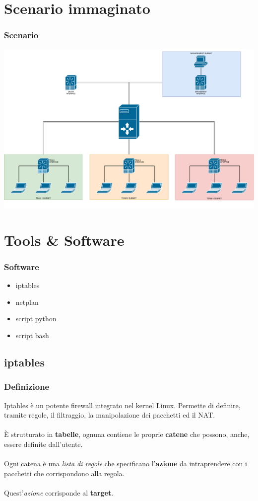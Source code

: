 \documentclass{beamer}
\begin{document}
\section{Scenario immaginato}

\begin{frame}
    \frametitle{Scenario}

    \includegraphics[width=\textwidth]{competition.pdf}

\end{frame}

\section{Tools \& Software}
\begin{frame}
    \frametitle{Software}
    \begin{itemize}
        \item <1-> iptables
        \item <2-> netplan
        \item <3-> script python
        \item <4-> script bash
    \end{itemize}
\end{frame}


\subsection*{iptables}
\begin{frame}
    \frametitle{Definizione}

    Iptables è un potente firewall integrato nel kernel Linux.
    Permette di definire, tramite regole, il filtraggio, la manipolazione dei pacchetti ed il NAT.
    \\~\\
    È strutturato in \textbf{tabelle}, ognuna contiene le proprie \textbf{catene} che possono, anche, essere definite dall'utente.
    \\~\\
    Ogni catena è una \textit{lista di regole} che specificano l'\textbf{azione} da intraprendere con i pacchetti che corrispondono alla regola.
    \\~\\
    Quest'\textit{azione} corrisponde al \textbf{target}.

\end{frame}
\end{document}
